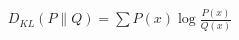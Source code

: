 \documentclass[preview]{standalone}
\begin{document}
\begin{align*}
D_{KL}(P \| Q) = \sum P(x) \log\frac{P(x)}{Q(x)}
\end{align*}
\end{document}
